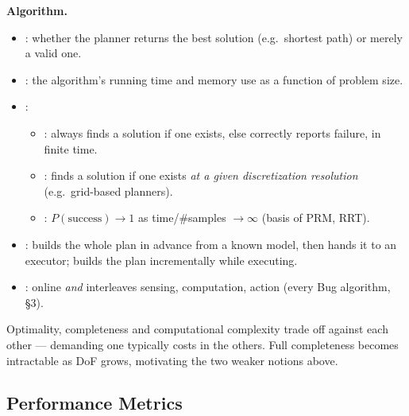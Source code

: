 \textbf{Algorithm.}
\begin{itemize}
\item {}: whether the planner returns the best solution (e.g.\ shortest path) or merely a valid one.
\item {}: the algorithm's running time and memory use as a function of problem size.
\item {}:
  \begin{itemize}
  \item {}: always finds a solution if one exists, else correctly reports failure, in finite time.
  \item {}: finds a solution if one exists \emph{at a given discretization resolution} (e.g.\ grid-based planners).
  \item {}: $P(\text{success})\to 1$ as time/\#samples $\to\infty$ (basis of PRM, RRT).
  \end{itemize}
\item {}:  builds the whole plan in advance from a known model, then hands it to an executor;  builds the plan incrementally while executing.
\item {}: online \emph{and} interleaves sensing, computation, action (every Bug algorithm, \S3).
\end{itemize}

\begin{notebox}
Optimality, completeness and computational complexity trade off against each other --- demanding one typically costs in the others. Full completeness becomes intractable as DoF grows, motivating the two weaker notions above.
\end{notebox}

\subsection{Performance Metrics}

